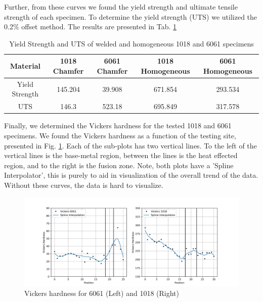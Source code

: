 \documentclass{article}
\begin{document}
\newpage
Further, from these curves we found the yield strength and ultimate tensile strength of each specimen. To determine the yield strength (UTS) we utilized the 0.2\% offset method. The results are presented in Tab. \ref{tab:q2lab7}

\begin{table}[!hp!]
    \centering
    \caption{Yield Strength and UTS of welded and homogeneous 1018 and 6061 specimens}
    \begin{tabular}{|c|c|c|c|c|}
        \toprule
        \bottomrule
        Material & 1018 Chamfer & 6061 Chamfer & 1018 Homogeneous & 6061 Homogeneous \\
        \toprule
        \bottomrule
        Yield Strength & 145.204 & 39.908 & 671.854 & 293.534 \\
        \hline
        UTS & 146.3 & 523.18 & 695.849 & 317.578 \\
        \hline
    \end{tabular}
    \label{tab:q2lab7}
\end{table}

Finally, we determined the Vickers hardness for the tested 1018 and 6061 specimens. We found the Vickers hardness as a function of the testing site, presented in Fig. \ref{fig:q4}. Each of the sub-plots has two vertical lines. To the left of the vertical lines is the base-metal region, between the lines is the heat effected region, and to the right is the fusion zone. Note, both plots have a 'Spline Interpolator', this is purely to aid in visualization of the overall trend of the data. Without these curves, the data is hard to visualize.  

\begin{figure}[!hp!]
    \centering
    \includegraphics[width=\linewidth]{plots/q4.png}
    \caption{Vickers hardness for 6061 (Left) and 1018 (Right)}
    \label{fig:q4}
\end{figure}

\newpage
\end{document}
